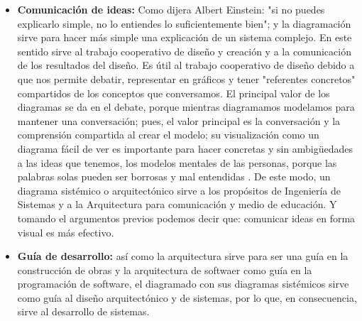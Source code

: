 \begin{itemize}
\item \textbf{Comunicación de ideas:} Como dijera Albert Einstein: "si no puedes explicarlo simple, no lo entiendes lo suficientemente bien"; y la diagramación sirve para hacer más simple una explicación de un sistema complejo. En este sentido sirve al trabajo cooperativo de diseño y creación y a la comunicación de los resultados del diseño. Es útil al trabajo cooperativo de diseño debido a que nos permite debatir, representar en gráficos y tener "referentes concretos" compartidos de los conceptos que conversamos. El principal valor de los diagramas se da en el debate, porque mientras diagramamos modelamos para mantener una conversación; pues, el valor principal es la conversación y la comprensión compartida al crear el modelo; su visualización como un diagrama fácil de ver es importante para hacer concretas y sin ambigüedades a las ideas que tenemos, los modelos mentales de las personas, porque las palabras solas pueden ser borrosas y mal entendidas \cite{Larman-Vodde-2008}. De este modo, un diagrama sistémico o arquitectónico sirve a los propósitos de Ingeniería de Sistemas y a la Arquitectura para comunicación y medio de educación. Y tomando el argumentos previos podemos decir que: comunicar ideas en forma visual es más efectivo.

\item \textbf{Guía de desarrollo:} así como la arquitectura sirve para ser una guía en la construcción de obras y la arquitectura de softwaer como guía en la programación de software, el diagramado con sus diagramas sistémicos sirve como guía al diseño arquitectónico y de sistemas, por lo que, en consecuencia, sirve al desarrollo de sistemas.

\end{itemize}

